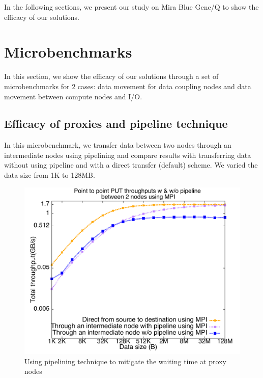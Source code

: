 \documentclass[final,5p,times]{elsarticle}
\begin{document}
In the following sections, we present our study on Mira Blue Gene/Q to show the efficacy of our solutions.

\section{Microbenchmarks}
\label{sec:microbenchmarks}
In this section, we show the efficacy of our solutions through a set of microbenchmarks for 2 cases: data movement for data coupling nodes and data movement between compute nodes and I/O.

\subsection{Efficacy of proxies and pipeline technique}


In this microbenchmark, we transfer data between two nodes through an intermediate nodes using pipelining and compare results with transferring data without using pipeline and with a direct transfer (default) scheme. We varied the data size from 1K  to 128MB.

\begin{figure}[!htb]
\centering
\includegraphics[scale=0.3]{figures/pipeline_mpi.pdf}
\caption{Using pipelining technique to mitigate the waiting time at proxy nodes}
\label{fig:pipeline_mpi}
\end{figure}
\end{document}

